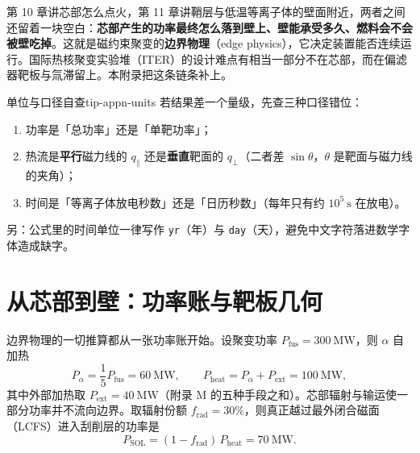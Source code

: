 
第 10 章讲芯部怎么点火，第 11 章讲鞘层与低温等离子体的壁面附近，两者之间还留着一块空白：\textbf{芯部产生的功率最终怎么落到壁上、壁能承受多久、燃料会不会被壁吃掉}。这就是磁约束聚变的\textbf{边界物理}（edge physics），它决定装置能否连续运行。国际热核聚变实验堆（ITER）的设计难点有相当一部分不在芯部，而在偏滤器靶板与氚滞留上。本附录把这条链条补上。

\begin{tip}{单位与口径自查}{tip-appn-units}
若结果差一个量级，先查三种口径错位：
\begin{enumerate}[nosep,leftmargin=1.6em]
  \item 功率是「总功率」还是「单靶功率」；
  \item 热流是\textbf{平行}磁力线的 $q_\parallel$ 还是\textbf{垂直}靶面的 $q_\perp$（二者差 $\sin\theta$，$\theta$ 是靶面与磁力线的夹角）；
  \item 时间是「等离子体放电秒数」还是「日历秒数」（每年只有约 $10^{5}\ \mathrm{s}$ 在放电）。
\end{enumerate}
另：公式里的时间单位一律写作 \texttt{yr}（年）与 \texttt{day}（天），避免中文字符落进数学字体造成缺字。
\end{tip}


\section{从芯部到壁：功率账与靶板几何}

边界物理的一切推算都从一张功率账开始。设聚变功率 $P_{\mathrm{fus}}=300\ \mathrm{MW}$，则 $\alpha$ 自加热
\begin{equation}
P_\alpha=\frac15P_{\mathrm{fus}}=60\ \mathrm{MW},
\qquad
P_{\mathrm{heat}}=P_\alpha+P_{\mathrm{ext}}=100\ \mathrm{MW},
\end{equation}
其中外部加热取 $P_{\mathrm{ext}}=40\ \mathrm{MW}$（附录 M 的五种手段之和）。芯部辐射与输运使一部分功率并不流向边界。取辐射份额 $f_{\mathrm{rad}}=30\%$，则真正越过最外闭合磁面（LCFS）进入刮削层的功率是
\begin{equation}
P_{\mathrm{SOL}}=(1-f_{\mathrm{rad}})\,P_{\mathrm{heat}}=70\ \mathrm{MW}.
\label{eq:app-n-psol}
\end{equation}

